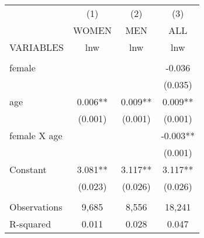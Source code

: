 \begin{tabular}{lccc} \hline
 & (1) & (2) & (3) \\
 & WOMEN & MEN & ALL \\
VARIABLES & lnw & lnw & lnw \\ \hline
 &  &  &  \\
female &  &  & -0.036 \\
 &  &  & (0.035) \\
age & 0.006** & 0.009** & 0.009** \\
 & (0.001) & (0.001) & (0.001) \\
female X age &  &  & -0.003** \\
 &  &  & (0.001) \\
Constant & 3.081** & 3.117** & 3.117** \\
 & (0.023) & (0.026) & (0.026) \\
 &  &  &  \\
Observations & 9,685 & 8,556 & 18,241 \\
 R-squared & 0.011 & 0.028 & 0.047 \\ \hline
\end{tabular}
